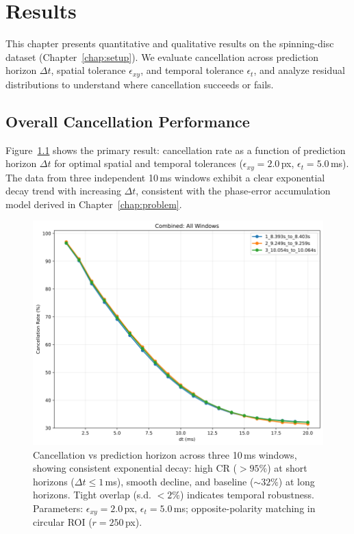 \chapter{Results}\label{chap:results}

This chapter presents quantitative and qualitative results on the spinning-disc dataset (Chapter~\ref{chap:setup}). We evaluate cancellation across prediction horizon $\Delta t$, spatial tolerance $\epsilon_{xy}$, and temporal tolerance $\epsilon_t$, and analyze residual distributions to understand where cancellation succeeds or fails.

\section{Overall Cancellation Performance}

Figure~\ref{fig:cancellation_vs_dt} shows the primary result: cancellation rate as a function of prediction horizon $\Delta t$ for optimal spatial and temporal tolerances ($\epsilon_{xy}=2.0$\,px, $\epsilon_t=5.0$\,ms). The data from three independent 10\,ms windows exhibit a clear exponential decay trend with increasing $\Delta t$, consistent with the phase-error accumulation model derived in Chapter~\ref{chap:problem}.

\begin{figure}[t]
  \centering
  \includegraphics[width=0.9\linewidth]{images/results_figures/windows_dt_sweep.png}
\caption{Cancellation vs prediction horizon across three 10\,ms windows, showing consistent exponential decay: high CR ($>95\%$) at short horizons ($\Delta t \leq 1$\,ms), smooth decline, and baseline ($\sim 32\%$) at long horizons. Tight overlap (s.d. $<2\%$) indicates temporal robustness. Parameters: $\epsilon_{xy}=2.0$\,px, $\epsilon_t=5.0$\,ms; opposite-polarity matching in circular ROI ($r=250$\,px).}
  \label{fig:cancellation_vs_dt}
\end{figure}


